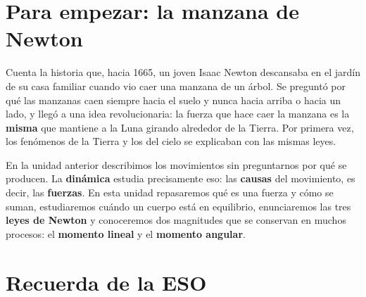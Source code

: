 
\section*{Para empezar: la manzana de Newton}

Cuenta la historia que, hacia 1665, un joven Isaac Newton descansaba en el jardín de su casa familiar cuando vio caer una manzana
de un árbol. Se preguntó por qué las manzanas caen siempre hacia el suelo y nunca hacia arriba o hacia un lado, y llegó a una idea
revolucionaria: la fuerza que hace caer la manzana es la \textbf{misma} que mantiene a la Luna girando alrededor de la Tierra. Por
primera vez, los fenómenos de la Tierra y los del cielo se explicaban con las mismas leyes.

En la unidad anterior describimos los movimientos sin preguntarnos por qué se producen. La \textbf{dinámica} estudia precisamente
eso: las \textbf{causas} del movimiento, es decir, las \textbf{fuerzas}. En esta unidad repasaremos qué es una fuerza y cómo se suman,
estudiaremos cuándo un cuerpo está en equilibrio, enunciaremos las tres \textbf{leyes de Newton} y conoceremos dos magnitudes que se
conservan en muchos procesos: el \textbf{momento lineal} y el \textbf{momento angular}.

\section{Recuerda de la ESO}\label{sec:ud10-eso}

